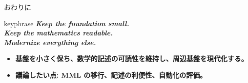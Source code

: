 \documentclass[dvipdfmx,aspectratio=169,11pt]{beamer}
\begin{document}
\begin{frame}[fragile,t]{おわりに}
\begin{center}
\begin{beamercolorbox}[rounded=true,sep=2.5mm,wd=0.9\textwidth]{keyphrase}
\centering\itshape \textcolor{blue!55!black}{\textbf{Keep the foundation small.}}\\ \textcolor{blue!55!black}{\textbf{Keep the mathematics readable.}}\\ \textcolor{blue!55!black}{\textbf{Modernize everything else.}}
\end{beamercolorbox}
\end{center}
\begin{itemize}
\setlength{\itemsep}{1pt}
\setlength{\parsep}{0pt}
\setlength{\parskip}{0pt}
\item \textcolor{blue!55!black}{\textbf{基盤を小さく保ち、数学的記述の可読性を維持し、周辺基盤を現代化する。}}
\item \textcolor{blue!55!black}{\textbf{議論したい点: MML の移行、記述の利便性、自動化の評価。}}
\end{itemize}
\end{frame}

\appendix
\end{document}
